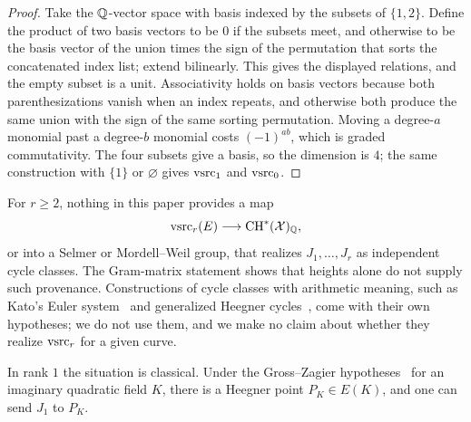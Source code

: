 \begin{proof}
Take the $\mathbb{Q}$-vector space with basis indexed by the subsets of
$\{1,2\}$.  Define the product of two basis vectors to be $0$ if the
subsets meet, and otherwise to be the basis vector of the union times the
sign of the permutation that sorts the concatenated index list; extend
bilinearly.  This gives the displayed relations, and the empty subset is a
unit.  Associativity holds on basis vectors because both
parenthesizations vanish when an index repeats, and otherwise both
produce the same union with the sign of the same sorting permutation.
Moving a degree-$a$ monomial past a degree-$b$ monomial costs
$(-1)^{ab}$, which is graded commutativity.  The four subsets give a basis,
so the dimension is $4$; the same construction with $\{1\}$ or
$\varnothing$ gives $\mathrm{vsrc}_1$ and $\mathrm{vsrc}_0$.
\end{proof}

\begin{remark}\label{rmk:apparatus:vsrc-no-licensed-descent}
For $r\ge2$, nothing in this paper provides a map
\[
  \mathrm{vsrc}_r(E)\longrightarrow \mathrm{CH}^*(\mathcal X)_{\mathbb{Q}},
\]
or into a Selmer or Mordell--Weil group, that realizes $J_1,\ldots,J_r$ as
independent cycle classes.  The Gram-matrix statement
 shows that heights alone do not
supply such provenance.  Constructions of cycle classes with arithmetic
meaning, such as Kato's Euler system~\citep{Kato2004} and generalized
Heegner cycles~\citep{BertoliniDarmonPrasanna2013}, come with their own
hypotheses; we do not use them, and we make no claim about whether they
realize $\mathrm{vsrc}_r$ for a given curve.
\end{remark}

In rank $1$ the situation is classical.  Under the Gross--Zagier
hypotheses~\citep{GrossZagier1986,Kolyvagin1990} for an imaginary
quadratic field $K$, there is a Heegner point $P_K\in E(K)$, and one can
send $J_1$ to $P_K$.

